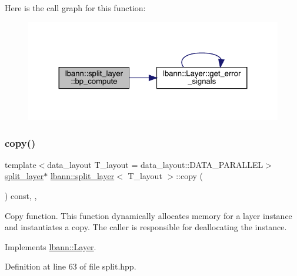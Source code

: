 Here is the call graph for this function\+:\nopagebreak
\begin{figure}[H]
\begin{center}
\leavevmode
\includegraphics[width=324pt]{classlbann_1_1split__layer_ae7b54dc12b2560d27f506d5f34c4074f_cgraph}
\end{center}
\end{figure}
\mbox{\label{classlbann_1_1split__layer_ae6b974e17e27163c6856b6114b7d6362}} 
\subsubsection{\texorpdfstring{copy()}{copy()}}
{\footnotesize\ttfamily template$<$data\+\_\+layout T\+\_\+layout = data\+\_\+layout\+::\+D\+A\+T\+A\+\_\+\+P\+A\+R\+A\+L\+L\+EL$>$ \\
\hyperlink{classlbann_1_1split__layer}{split\+\_\+layer}$\ast$ \hyperlink{classlbann_1_1split__layer}{lbann\+::split\+\_\+layer}$<$ T\+\_\+layout $>$\+::copy (\begin{DoxyParamCaption}{ }\end{DoxyParamCaption}) const\hspace{0.3cm}{\ttfamily [inline]}, {\ttfamily [override]}, {\ttfamily [virtual]}}

Copy function. This function dynamically allocates memory for a layer instance and instantiates a copy. The caller is responsible for deallocating the instance. 

Implements \hyperlink{classlbann_1_1Layer_af420f22bbac801c85483ade84588a23f}{lbann\+::\+Layer}.



Definition at line 63 of file split.\+hpp.


